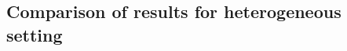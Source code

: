 \documentclass[twoside]{article}
\begin{document}
\subsection{Comparison of results for heterogeneous setting}\label{sec:gen-proof-hett}
\begin{table}[H]
    \centering
    \caption{Comparison of results with compression and periodic averaging in the heterogeneous setting. 
    UG and PP stand for Unbounded Gradient and Privacy Property respectively.}
\label{table:2}
\end{table}
\end{document}
